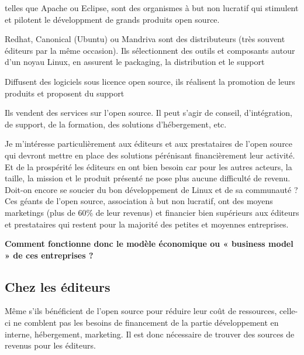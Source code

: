 			\begin{description}[font=\color{burntorange}]
				\item[Les fondations:] telles que Apache ou Eclipse, sont des organismes à but non lucratif qui stimulent et pilotent le développment de grands produits open source.
				\item[Les distributeurs:] Redhat, Canonical (Ubuntu) ou Mandriva sont des distributeurs (très souvent éditeurs par la même occasion). Ils sélectionnent des outils et composants autour d'un noyau Linux, en assurent le packaging, la distribution et le support
				\item[Les éditeurs:] Diffusent des logiciels sous licence open source, ils réalisent la promotion de leurs produits et proposent du support
				\item[Les prestataires: ] Ils vendent des services sur l'open source. Il peut s'agir de conseil, d'intégration, de support, de la formation, des solutions d'hébergement, etc.
			\end{description}

			Je m'intéresse particulièrement aux éditeurs et aux prestataires de l'open source qui devront mettre en place des solutions pérénisant financièrement leur activité.\\

			Et de la prospérité les éditeurs en ont bien besoin car pour les autres acteurs, la taille, la mission et le produit présenté ne pose plus aucune difficulté de revenu. Doit-on encore se soucier du bon développement de Linux et de sa communauté ? Ces géants de l'open source, association à but non lucratif, ont des moyens marketings (plus de 60\% de leur revenus) et financier bien supérieurs aux éditeurs et prestataires qui restent pour la majorité des petites et moyennes entreprises.

			\textbf{Comment fonctionne donc le modèle économique ou « business model » de ces entreprises ?}\\

		\subsection{Chez les éditeurs}

			Même s'ils bénéficient de l'open source pour réduire leur coût de ressources, celle-ci ne comblent pas les besoins de financement de la partie développement en interne, hébergement, marketing. Il est donc nécessaire de trouver des sources de revenus pour les éditeurs.

